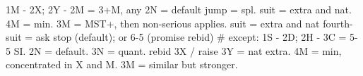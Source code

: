 1M - 2X; 2Y -
2M = 3+M, any
    2N = default
        jump = spl. suit = extra and nat. 4M = min.
        3M = MST+, then non-serious applies.
    suit = extra and nat
fourth-suit = ask stop (default); or 6-5 (promise rebid)
    # except: 1S - 2D; 2H - 3C = 5-5 SI.
2N = default. 3N = quant.
rebid 3X / raise 3Y = nat extra.
4M = min, concentrated in X and M. 3M = similar but stronger. 